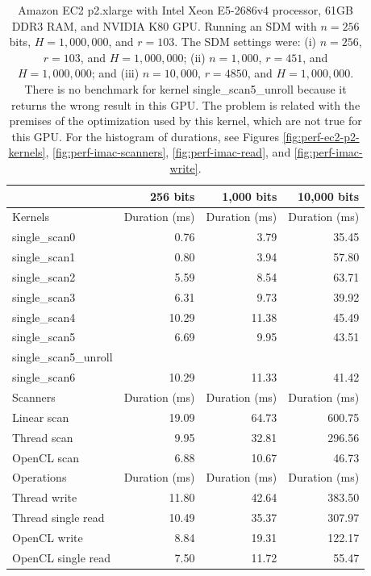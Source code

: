


\begin{table}[!htb]
\centering
\begin{tabular}{lrrr}
    \toprule
    & \textbf{256 bits} & \textbf{1,000 bits} & \textbf{10,000 bits} \\ \hline
	\hline
	Kernels & Duration (ms) & Duration (ms) & Duration (ms) \\ \hline
    single\_scan0 &  0.76 &  3.79 & 35.45 \\
    single\_scan1 &  0.80 &  3.94 & 57.80 \\
    single\_scan2 &  5.59 &  8.54 & 63.71 \\
    single\_scan3 &  6.31 &  9.73 & 39.92 \\
    single\_scan4 & 10.29 & 11.38 & 45.49 \\
    single\_scan5 &  6.69 &  9.95 & 43.51 \\
	single\_scan5\_unroll & & & \\
    single\_scan6 & 10.29 & 11.33 & 41.42 \\
    \hline
	Scanners & Duration (ms) & Duration (ms) & Duration (ms) \\ \hline
    Linear scan & 19.09 & 64.73 & 600.75 \\
    Thread scan &  9.95 & 32.81 & 296.56 \\
    OpenCL scan &  6.88 & 10.67 &  46.73 \\ \hline
    \hline
	Operations & Duration (ms) & Duration (ms) & Duration (ms) \\ \hline
    Thread write       & 11.80 & 42.64 & 383.50 \\
    Thread single read & 10.49 & 35.37 & 307.97 \\
    OpenCL write       &  8.84 & 19.31 & 122.17 \\
    OpenCL single read &  7.50 & 11.72 &  55.47 \\
    \bottomrule
\end{tabular}
\caption{Amazon EC2 p2.xlarge with Intel Xeon E5-2686v4 processor, 61GB DDR3 RAM, and NVIDIA K80 GPU. Running an SDM with $n=256$ bits, $H=1,000,000$, and $r=103$. The SDM settings were: (i) $n=256$, $r=103$, and $H=1,000,000$; (ii) $n=1,000$, $r=451$, and $H=1,000,000$; and (iii) $n=10,000$, $r=4850$, and $H=1,000,000$. There is no benchmark for kernel single\_scan5\_unroll because it returns the wrong result in this GPU. The problem is related with the premises of the optimization used by this kernel, which are not true for this GPU.
For the histogram of durations, see Figures \ref{fig:perf-ec2-p2-kernels}, \ref{fig:perf-imac-scanners}, \ref{fig:perf-imac-read}, and \ref{fig:perf-imac-write}.
\label{tab:perf-ec2-p2}}
\end{table}


